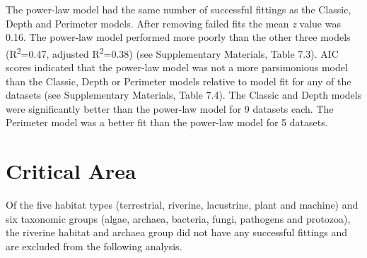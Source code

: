 {%
\noindent The power-law model had the same number of successful fittings as the Classic, Depth and Perimeter models. After removing failed fits the mean \textit{z} value was 0.16. The power-law model performed more poorly than the other three models (R\textsuperscript{2}=0.47, adjusted R\textsuperscript{2}=0.38) (see Supplementary Materials, Table 7.3). AIC scores indicated that the power-law model was not a more parsimonious model than the Classic, Depth or Perimeter models relative to model fit for any of the datasets (see Supplementary Materials, Table 7.4). The Classic and Depth models were significantly better than the power-law model for 9 datasets each. The Perimeter model was a better fit than the power-law model for 5 datasets.   
  
\section{Critical Area}
{\texorpdfstring
Off the five habitat types (terrestrial, riverine, lacustrine, plant and machine) and six taxonomic groups (algae, archaea, bacteria, fungi, pathogens and protozoa), the riverine habitat and archaea group did not have any successful fittings and are excluded from the following analysis.\\


}}
